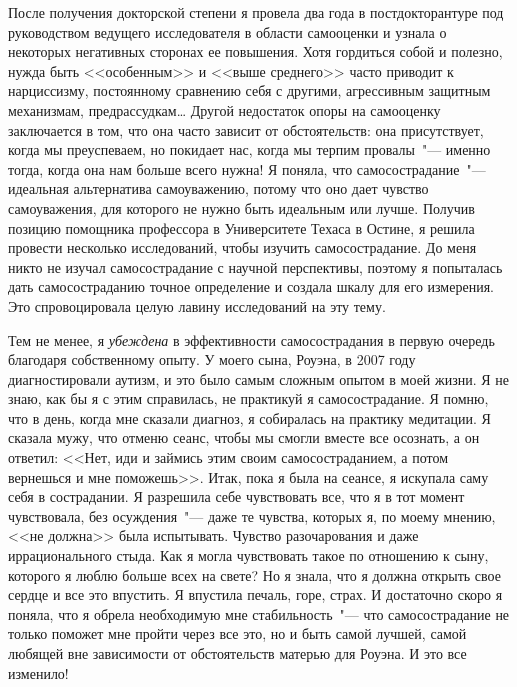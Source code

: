 	После получения докторской степени я провела два года в постдокторантуре под руководством ведущего исследователя в области самооценки и узнала о некоторых негативных сторонах ее повышения. Хотя гордиться собой и полезно, нужда быть <<особенным>> и <<выше среднего>> часто приводит к нарциссизму, постоянному сравнению себя с другими, агрессивным защитным механизмам, предрассудкам… Другой недостаток опоры на самооценку заключается в том, что она часто зависит от обстоятельств: она присутствует, когда мы преуспеваем, но покидает нас, когда мы терпим провалы~"--- именно тогда, когда она нам больше всего нужна! Я поняла, что самосострадание~"--- идеальная альтернатива самоуважению, потому что оно дает чувство самоуважения, для которого не нужно быть идеальным или лучше. Получив позицию помощника профессора в Университете Техаса в Остине, я решила провести несколько исследований, чтобы изучить самосострадание. До меня никто не изучал самосострадание с научной перспективы, поэтому я попыталась дать самосостраданию точное определение и создала шкалу для его измерения. Это спровоцировала целую лавину исследований на эту тему.  
	
	Тем не менее, я \emph{убеждена} в эффективности самосострадания в первую очередь благодаря собственному опыту. У моего сына, Роуэна, в 2007 году диагностировали аутизм, и это было самым сложным опытом в моей жизни. Я не знаю, как бы я с этим справилась, не практикуй я самосострадание. Я помню, что в день, когда мне сказали диагноз, я собиралась на практику медитации. Я сказала мужу, что отменю сеанс, чтобы мы смогли вместе все осознать, а он ответил: <<Нет, иди и займись этим своим самосостраданием, а потом вернешься и мне поможешь>>. Итак, пока я была на сеансе, я искупала саму себя в сострадании. Я разрешила себе чувствовать все, что я в тот момент чувствовала, без осуждения~"--- даже те чувства, которых я, по моему мнению, <<не должна>> была испытывать. Чувство разочарования и даже иррационального стыда. Как я могла чувствовать такое по отношению к сыну, которого я люблю больше всех на свете? Но я знала, что я должна открыть свое сердце и все это впустить. Я впустила печаль, горе, страх. И достаточно скоро я поняла, что я обрела необходимую мне стабильность~"--- что самосострадание не только поможет мне пройти через все это, но и быть самой лучшей, самой любящей вне зависимости от обстоятельств матерью для Роуэна. И это все изменило!
	
